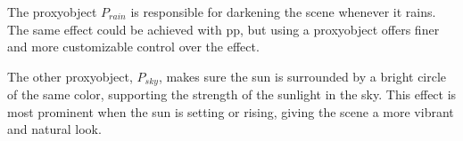 \clearpage

\noindent
The \gls{proxyobject} \color{darkercyan}$P_{rain}$ \color{black} is responsible for darkening the scene whenever it rains.
The same effect could be achieved with \gls{pp}, but using a \gls{proxyobject} offers finer and more customizable control over the effect.

\begin{figure}[H]
    \centering
    \label{img:techimpl:rainproxy}
\end{figure}

\noindent
The other \gls{proxyobject}, \color{darkercyan}$P_{sky}$\color{black}, makes sure the sun is surrounded by a bright circle of the same color, supporting the strength of the sunlight in the sky.
This effect is most prominent when the sun is setting or rising, giving the scene a more vibrant and natural look.

